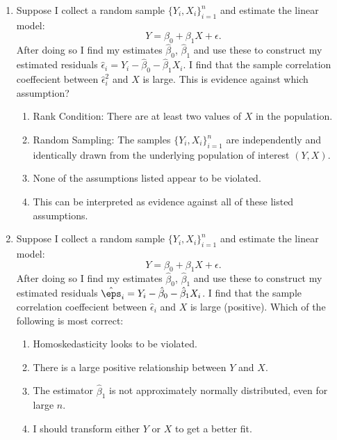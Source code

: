 \documentclass[10pt]{article}
\begin{document}
\begin{enumerate}
	\item Suppose I collect a random sample \(\{Y_i,X_i\}_{i=1}^n\) and estimate the linear model:\[Y = \beta_0 + \beta_1X + \epsilon.\] After doing so I find my estimates \(\hat\beta_0\),  \(\hat\beta_1\) and use these to construct my estimated residuals  \(\hat\epsilon_i = Y_i - \hat\beta_0 - \hat\beta_1X_i\). I find that the sample correlation coeffecient between  \(\hat\epsilon_i^2\) and  \(X\) is large. This is evidence against which assumption?
	 \begin{enumerate}
		 \item Rank Condition: There are at least two values of \(X\) in the population.
		 \item Random Sampling: The samples \(\{Y_i,X_i\}_{i=1}^n\) are independently and identically drawn from the underlying population of interest \((Y,X)\).
	 	 \item None of the assumptions listed appear to be violated.
		 \item This can be interpreted as evidence against all of these listed assumptions.
	\end{enumerate}
	 

	\item Suppose I collect a random sample \(\{Y_i,X_i\}_{i=1}^n\) and estimate the linear model:\[Y = \beta_0 + \beta_1X + \epsilon.\] After doing so I find my estimates \(\hat\beta_0\),  \(\hat\beta_1\) and use these to construct my estimated residuals  \(\hat\eps_i = Y_i - \hat\beta_0 - \hat\beta_1X_i\). I find that the sample correlation coeffecient between  \(\hat\epsilon_i\) and  \(X\) is large (positive). Which of the following is most correct:
	\begin{enumerate}
		\item Homoskedasticity looks to be violated.
		\item There is a large positive relationship between \(Y\) and  \(X\).
		\item The estimator \(\hat\beta_1\) is not approximately normally distributed, even for large \(n\).
		\item I should transform either \(Y\) or  \(X\) to get a better fit.
	\end{enumerate}
	 



\end{enumerate}
\end{document}
